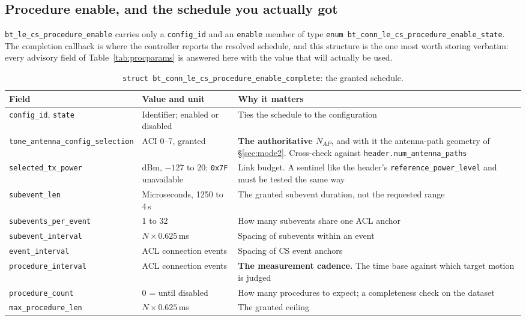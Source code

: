 \documentclass[11pt,a4paper]{article}
\newcommand{\code}[1]{\texttt{\small #1}}
\newcommand{\Nap}{\ensuremath{N_{AP}}}
\begin{document}
\subsection{Procedure enable, and the schedule you actually got}
\label{sec:procenable}

\code{bt\_\allowbreak{}le\_\allowbreak{}cs\_\allowbreak{}procedure\_\allowbreak{}enable} carries only a \code{config\_\allowbreak{}id} and an
\code{enable} member of type \code{enum bt\_\allowbreak{}conn\_\allowbreak{}le\_\allowbreak{}cs\_\allowbreak{}procedure\_\allowbreak{}enable\_\allowbreak{}state}. The
completion callback is where the controller reports the resolved schedule, and this structure is the
one most worth storing verbatim: every advisory field of Table~\ref{tab:procparams} is answered here
with the value that will actually be used.

\begin{table}[htb]
\caption{\code{struct bt\_\allowbreak{}conn\_\allowbreak{}le\_\allowbreak{}cs\_\allowbreak{}procedure\_\allowbreak{}enable\_\allowbreak{}complete}: the granted schedule.}
\label{tab:procenable}
\centering\scriptsize
\begin{tabular}{@{}L{42mm}L{42mm}L{50mm}@{}}
\toprule
Field & Value and unit & Why it matters \\
\midrule
\code{config\_\allowbreak{}id}, \code{state} & Identifier; enabled or disabled & Ties the schedule to the configuration \\
\code{tone\_\allowbreak{}antenna\_\allowbreak{}config\_\allowbreak{}selection} & ACI 0--7, granted & \textbf{The authoritative $\Nap$}, and with it the antenna-path geometry of \S\ref{sec:mode2}. Cross-check against \code{header.num\_\allowbreak{}antenna\_\allowbreak{}paths} \\
\code{selected\_\allowbreak{}tx\_\allowbreak{}power} & dBm, $-127$ to $20$; \code{0x7F} unavailable & Link budget. A sentinel like the header's \code{reference\_\allowbreak{}power\_\allowbreak{}level} and must be tested the same way \\
\code{subevent\_\allowbreak{}len} & Microseconds, 1250 to 4\,s & The granted subevent duration, not the requested range \\
\code{subevents\_\allowbreak{}per\_\allowbreak{}event} & 1 to 32 & How many subevents share one ACL anchor \\
\code{subevent\_\allowbreak{}interval} & $N\times0.625$\,ms & Spacing of subevents within an event \\
\code{event\_\allowbreak{}interval} & ACL connection events & Spacing of CS event anchors \\
\code{procedure\_\allowbreak{}interval} & ACL connection events & \textbf{The measurement cadence.} The time base against which target motion is judged \\
\code{procedure\_\allowbreak{}count} & 0 = until disabled & How many procedures to expect; a completeness check on the dataset \\
\code{max\_\allowbreak{}procedure\_\allowbreak{}len} & $N\times0.625$\,ms & The granted ceiling \\
\bottomrule
\end{tabular}
\end{table}
\end{document}
